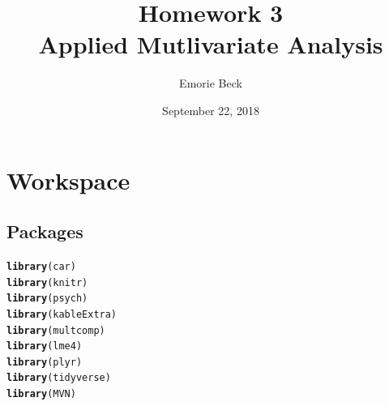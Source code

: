 \documentclass{article}\usepackage[]{graphicx}\usepackage[]{color}
\title{%
Homework 3\\
\large Applied Mutlivariate Analysis}
\date{September 22, 2018}
\author{Emorie Beck}
\makeatletter
\newcommand{\hlstd}[1]{\textcolor[rgb]{0.345,0.345,0.345}{#1}}%
\newcommand{\hlkwd}[1]{\textcolor[rgb]{0.737,0.353,0.396}{\textbf{#1}}}%
\newenvironment{kframe}{%
 \def\at@end@of@kframe{}%
 \ifinner\ifhmode%
  \def\at@end@of@kframe{\end{minipage}}%
  \begin{minipage}{\columnwidth}%
 \fi\fi%
 \def\FrameCommand##1{\hskip\@totalleftmargin \hskip-\fboxsep
 \colorbox{shadecolor}{##1}\hskip-\fboxsep
     \hskip-\linewidth \hskip-\@totalleftmargin \hskip\columnwidth}%
 \MakeFramed {\advance\hsize-\width
   \@totalleftmargin\z@ \linewidth\hsize
   \@setminipage}}%
 {\par\unskip\endMakeFramed%
 \at@end@of@kframe}
\newenvironment{knitrout}{}{} %
\makeatother
\begin{document}
\maketitle

\section{Workspace}
\subsection{Packages}



\begin{knitrout}
\color{fgcolor}\begin{kframe}
\begin{alltt}
\hlkwd{library}\hlstd{(car)}
\hlkwd{library}\hlstd{(knitr)}
\hlkwd{library}\hlstd{(psych)}
\hlkwd{library}\hlstd{(kableExtra)}
\hlkwd{library}\hlstd{(multcomp)}
\hlkwd{library}\hlstd{(lme4)}
\hlkwd{library}\hlstd{(plyr)}
\hlkwd{library}\hlstd{(tidyverse)}
\hlkwd{library}\hlstd{(MVN)}
\end{alltt}
\end{kframe}
\end{knitrout}
\end{document}
